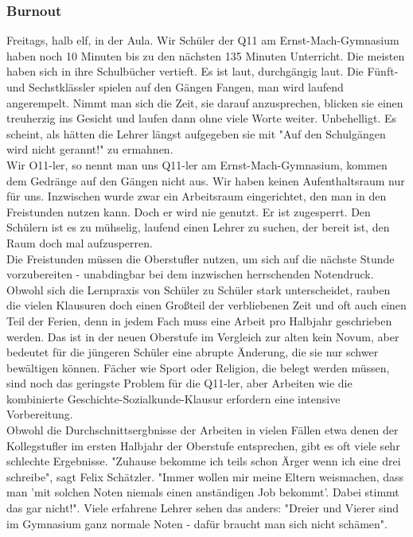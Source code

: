 \documentclass[a4paper,12pt,twoside]{scrbook}
\begin{document}
\subsubsection{Burnout}
Freitags, halb elf, in der Aula. Wir Schüler der Q11 am Ernst-Mach-Gymnasium haben noch 10 Minuten bis zu den nächsten 135 Minuten Unterricht. Die meisten haben sich in ihre Schulbücher vertieft. Es ist laut, durchgängig laut. Die Fünft- und Sechstklässler spielen auf den Gängen Fangen, man wird laufend angerempelt. Nimmt man sich die Zeit, sie darauf anzusprechen, blicken sie einen treuherzig ins Gesicht und laufen dann ohne viele Worte weiter. Unbehelligt. Es scheint, als hätten die Lehrer längst aufgegeben sie mit "Auf den Schulgängen wird nicht gerannt!" zu ermahnen.
\\
Wir O11-ler, so nennt man uns Q11-ler am Ernst-Mach-Gymnasium, kommen dem Gedränge auf den Gängen nicht aus. Wir haben keinen Aufenthaltsraum nur für uns. Inzwischen wurde zwar ein Arbeitsraum eingerichtet, den man in den Freistunden nutzen kann. Doch er wird nie genutzt. Er ist zugesperrt. Den Schülern ist es zu mühselig, laufend einen Lehrer zu suchen, der bereit ist, den Raum doch mal aufzusperren.
\\
Die Freistunden müssen die Oberstufler nutzen, um sich auf die nächste Stunde vorzubereiten - unabdingbar bei dem inzwischen herrschenden Notendruck. Obwohl sich die Lernpraxis von Schüler zu Schüler stark unterscheidet, rauben die vielen Klausuren doch einen Großteil der verbliebenen Zeit und oft auch einen Teil der Ferien, denn in jedem Fach muss eine Arbeit pro Halbjahr geschrieben werden. Das ist in der neuen Oberstufe im Vergleich zur alten kein Novum, aber bedeutet für die jüngeren Schüler eine abrupte Änderung, die sie nur schwer bewältigen können. Fächer wie Sport oder Religion, die belegt werden müssen, sind noch das geringste Problem für die Q11-ler, aber Arbeiten wie die kombinierte Geschichte-Sozialkunde-Klausur erfordern eine intensive Vorbereitung.
\\
Obwohl die Durchschnittsergbnisse der Arbeiten in vielen Fällen etwa denen der Kollegstufler im ersten Halbjahr der Oberstufe entsprechen, gibt es oft viele sehr schlechte Ergebnisse. "Zuhause bekomme ich teils schon Ärger wenn ich eine drei schreibe", sagt Felix Schätzler. "Immer wollen mir meine Eltern weismachen, dass man 'mit solchen Noten niemals einen anständigen Job bekommt'. Dabei stimmt das gar nicht!".
Viele erfahrene Lehrer sehen das anders: "Dreier und Vierer sind im Gymnasium ganz normale Noten - dafür braucht man sich nicht schämen".
\end{document}

